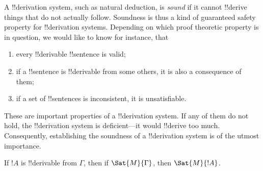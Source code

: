 \documentclass[../../include/open-logic-section]{subfiles}
\begin{document}

\begin{explain}
A !!{derivation} system, such as natural deduction, is \emph{sound}
if it cannot !!{derive} things that do not actually follow.  Soundness is
thus a kind of guaranteed safety property for !!{derivation} systems.
Depending on which proof theoretic property is in question, we would
like to know for instance, that
\begin{enumerate}
\item every !!{derivable} !!{sentence} is valid;
\item if a !!{sentence} is !!{derivable} from some others, it is also a
  consequence of them;
\item if a set of !!{sentence}s is inconsistent, it is unsatisfiable.
\end{enumerate}
These are important properties of a !!{derivation} system.  If any of them do
not hold, the !!{derivation} system is deficient---it would !!{derive} too much.
Consequently, establishing the soundness of a !!{derivation} system is of the
utmost importance.
\end{explain}

\begin{thm}[Soundness]
 If $!A$ is !!{derivable} from $\Gamma$,
 then if $\Sat{M}{\Gamma}$, then $\Sat{M}{!A}$.
\end{thm}
\end{document}
